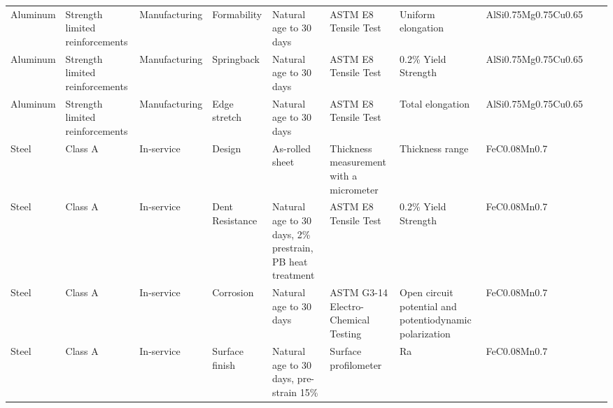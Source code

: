 \begin{table}[!htbp]
\begin{threeparttable}
{\begin{tabular}{@{}p{1.5cm} p{2.4cm} p{2cm} p{2.5cm} p{4cm} p{3.5cm} p{3.8cm} p{3.2cm} p{2.7cm} p{2.7cm}@{}}
{Aluminum} & {Strength limited reinforcements}  & {Manufacturing} & {Formability}     & {Natural age to 30 days}                                              & {ASTM E8 Tensile Test}                    & {Uniform elongation}                                       & {AlSi0.75Mg0.75Cu0.65}        & {}             & {}                   \\
{Aluminum} & {Strength limited reinforcements}  & {Manufacturing} & {Springback}      & {Natural age to 30 days}                                              & {ASTM E8 Tensile Test}                    & {0.2\% Yield Strength}                                     & {AlSi0.75Mg0.75Cu0.65}        & {}             & {}                   \\
{Aluminum} & {Strength limited reinforcements}  & {Manufacturing} & {Edge stretch}    & {Natural age to 30 days}                                              & {ASTM E8 Tensile Test}                    & {Total elongation}                                         & {AlSi0.75Mg0.75Cu0.65}        & {}             & {}                   \\ \hline
{Steel}    & {Class A}                          & {In-service}    & {Design}          & {As-rolled sheet}                                                     & {Thickness measurement with a micrometer} & {Thickness range}                                          & {FeC0.08Mn0.7}                & {}             & {}                   \\
{Steel}    & {Class A}                          & {In-service}    & {Dent Resistance} & {Natural age to 30 days, 2\% prestrain, PB heat treatment}            & {ASTM E8 Tensile Test}                    & {0.2\% Yield Strength}                                     & {FeC0.08Mn0.7}                & {}             & {}                   \\
{Steel}    & {Class A}                          & {In-service}    & {Corrosion}       & {Natural age to 30 days}                                              & {ASTM G3-14 Electro-Chemical Testing}     & {Open circuit potential and potentiodynamic polarization}  & {FeC0.08Mn0.7}                & {}             & {}                   \\
{Steel}    & {Class A}                          & {In-service}    & {Surface finish}  & {Natural age to 30 days, pre-strain 15\%}                             & {Surface profilometer}                    & {Ra}                                                       & {FeC0.08Mn0.7}                & {}             & {}                   \\

\end{tabular}}
\end{threeparttable}
\end{table}
